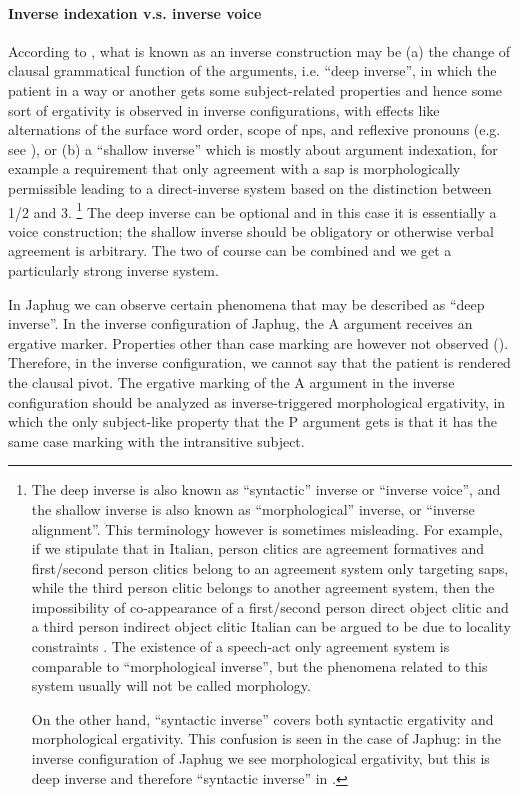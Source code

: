\documentclass[a4paper, oneside, 12pt]{report}
\begin{document}
\paragraph*{Inverse indexation v.s. inverse voice}
According to \citet{oxford2023tale},
what is known as an inverse construction may be 
(a) the change of clausal grammatical function of the arguments,
i.e. ``deep inverse'', in which the patient in a way or another gets some subject-related properties 
and hence some sort of ergativity is observed in inverse configurations,
with effects like alternations of the surface word order,
scope of \acp{np}, and reflexive pronouns (e.g. see \citealt{bruening2005algonquian}), or
(b) a ``shallow inverse'' which is mostly about argument indexation, 
for example a requirement that only agreement with a \ac{sap} 
is morphologically permissible
leading to a direct-inverse system based on the distinction between 1/2 and 3.%
\footnote{
    The deep inverse is also known as ``syntactic'' inverse or ``inverse voice'',
    and the shallow inverse is also known as ``morphological'' inverse, or ``inverse alignment''.
    This terminology however is sometimes misleading.
    For example, if we stipulate that in Italian,
    person clitics are agreement formatives
    and first/second person clitics belong to an agreement system only targeting \ac{sap}s,
    while the third person clitic belongs to another agreement system,
    then the impossibility of co-appearance of a first/second person direct object clitic 
    and a third person indirect object clitic Italian 
    can be argued to be due to locality constraints
    \citep{bianchi2006syntax}.
    The existence of a speech-act only agreement system is comparable to ``morphological inverse'',
    but the phenomena related to this system usually will not be called morphology.

    On the other hand, ``syntactic inverse'' covers both syntactic ergativity and morphological ergativity.
    This confusion is seen in the case of Japhug:
    in the inverse configuration of Japhug we see morphological ergativity,
    but this is deep inverse and therefore ``syntactic inverse'' in \citet{oxford2023tale}.
}
The deep inverse can be optional and in this case it is essentially a voice construction;
the shallow inverse should be obligatory or otherwise verbal agreement is arbitrary.
The two of course can be combined and we get a particularly strong inverse system.

In Japhug we can observe certain phenomena that may be described as ``deep inverse''.
In the inverse configuration of Japhug, 
the A argument receives an ergative marker.
Properties other than case marking are however not observed
().
Therefore, in the inverse configuration, we cannot say that
the patient is rendered the clausal pivot.
The ergative marking of the A argument in the inverse configuration should be analyzed as
inverse-triggered morphological ergativity,
in which the only subject-like property that the P argument gets
is that it has the same case marking with the intransitive subject. 
\end{document}
